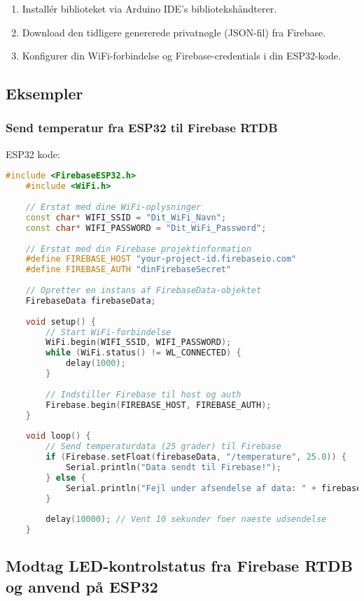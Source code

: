 \begin{enumerate}
	\item Installér biblioteket via Arduino IDE's bibliotekshåndterer.
	\item Download den tidligere genererede privatnøgle (JSON-fil) fra Firebase.
	\item Konfigurer din WiFi-forbindelse og Firebase-credentials i din ESP32-kode.
\end{enumerate}

\subsection*{Eksempler}

\subsubsection*{Send temperatur fra ESP32 til Firebase RTDB}

ESP32 kode:
\begin{lstlisting}[language=C++, caption=ESP32 kode til kommunikation med Firebase RTDB]
	#include <FirebaseESP32.h>
	#include <WiFi.h>
	
	// Erstat med dine WiFi-oplysninger
	const char* WIFI_SSID = "Dit_WiFi_Navn";
	const char* WIFI_PASSWORD = "Dit_WiFi_Password";
	
	// Erstat med din Firebase projektinformation
	#define FIREBASE_HOST "your-project-id.firebaseio.com"
	#define FIREBASE_AUTH "dinFirebaseSecret"
	
	// Opretter en instans af FirebaseData-objektet
	FirebaseData firebaseData;
	
	void setup() {
		// Start WiFi-forbindelse
		WiFi.begin(WIFI_SSID, WIFI_PASSWORD);
		while (WiFi.status() != WL_CONNECTED) {
			delay(1000);
		}
		
		// Indstiller Firebase til host og auth
		Firebase.begin(FIREBASE_HOST, FIREBASE_AUTH);
	}
	
	void loop() {
		// Send temperaturdata (25 grader) til Firebase
		if (Firebase.setFloat(firebaseData, "/temperature", 25.0)) {
			Serial.println("Data sendt til Firebase!");
		} else {
			Serial.println("Fejl under afsendelse af data: " + firebaseData.errorReason());
		}
		
		delay(10000); // Vent 10 sekunder foer naeste udsendelse
	}
\end{lstlisting}
\clearpage
\subsection*{Modtag LED-kontrolstatus fra Firebase RTDB og anvend på ESP32}

